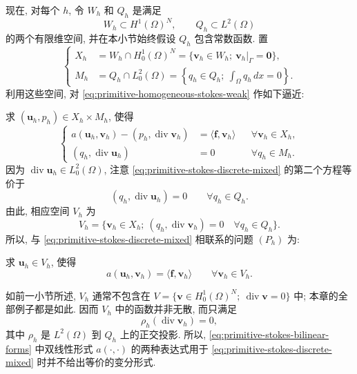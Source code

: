 现在, 对每个 $h$, 令 $W_h$ 和 $Q_h$ 是满足
\[
W_h\subset H^1(\Omega)^N,
\qquad
Q_h\subset L^2(\Omega)
\]
的两个有限维空间, 并在本小节始终假设 $Q_h$ 包含常数函数. 置
\begin{equation}\label{eq:primitive-stokes-discrete-spaces}
\left\{
\begin{aligned}
X_h&=W_h\cap H_0^1(\Omega)^N
=\{\mathbf v_h\in W_h;\ \mathbf v_h|_\Gamma=\mathbf0\},\\
M_h&=Q_h\cap L_0^2(\Omega)
=\left\{q_h\in Q_h;\ \int_\Omega q_h\,dx=0\right\}.
\end{aligned}
\right.
\end{equation}
利用这些空间, 对 \eqref{eq:primitive-homogeneous-stokes-weak} 作如下逼近:

求 $(\mathbf u_h,p_h)\in X_h\times M_h$, 使得
\begin{equation}\label{eq:primitive-stokes-discrete-mixed}
\left\{
\begin{aligned}
a(\mathbf u_h,\mathbf v_h)-(p_h,\operatorname{div}\mathbf v_h)
&=\langle\mathbf f,\mathbf v_h\rangle
&&\forall\mathbf v_h\in X_h,\\
(q_h,\operatorname{div}\mathbf u_h)&=0
&&\forall q_h\in M_h.
\end{aligned}
\right.
\end{equation}
因为 $\operatorname{div}\mathbf u_h\in L_0^2(\Omega)$,
注意 \eqref{eq:primitive-stokes-discrete-mixed} 的第二个方程等价于
\[
(q_h,\operatorname{div}\mathbf u_h)=0
\qquad\forall q_h\in Q_h.
\]
由此, 相应空间 $V_h$ 为
\[
V_h=\{\mathbf v_h\in X_h;\ (q_h,\operatorname{div}\mathbf v_h)=0
\quad\forall q_h\in Q_h\}.
\]
所以, 与 \eqref{eq:primitive-stokes-discrete-mixed} 相联系的问题 $(P_h)$ 为:

求 $\mathbf u_h\in V_h$, 使得
\begin{equation}\label{eq:primitive-stokes-discrete-kernel-problem}
a(\mathbf u_h,\mathbf v_h)=\langle\mathbf f,\mathbf v_h\rangle
\qquad\forall\mathbf v_h\in V_h.
\end{equation}

\setcounter{statement}{6}
\begin{Remark}\label{rem:primitive-discrete-velocity-not-divergence-free}
如前一小节所述, $V_h$ 通常不包含在
$V=\{\mathbf v\in H_0^1(\Omega)^N;\ \operatorname{div}\mathbf v=0\}$ 中;
本章的全部例子都是如此. 因而 $V_h$ 中的函数并非无散, 而只满足
\[
\rho_h(\operatorname{div}\mathbf v_h)=0,
\]
其中 $\rho_h$ 是 $L^2(\Omega)$ 到 $Q_h$ 上的正交投影. 所以,
\eqref{eq:primitive-stokes-bilinear-forms} 中双线性形式 $a(\cdot,\cdot)$
的两种表达式用于 \eqref{eq:primitive-stokes-discrete-mixed} 时并不给出等价的变分形式.
\end{Remark}

